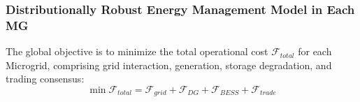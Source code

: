 \documentclass[preprint,12pt]{elsarticle}
\begin{document}
\subsubsection{Distributionally Robust Energy Management Model in Each MG}
The global objective is to minimize the total operational cost $\mathcal{F}_{total}$ for each Microgrid, comprising grid interaction, generation, storage degradation, and trading consensus:
\begin{equation}
\min \mathcal{F}_{total} = \mathcal{F}_{grid} + \mathcal{F}_{DG} + \mathcal{F}_{BESS} + \mathcal{F}_{trade}
\label{eq:total_cost}
\end{equation}
\makeatletter
\newenvironment{breakablealgorithm}
  {%
   \begin{center}
     \refstepcounter{algorithm}%
     \hrule height.8pt depth0pt \kern2pt%
     \renewcommand{\caption}[2][\relax]{%
       {\raggedright\textbf{~Algorithm~\thealgorithm:} ##2\par}%
       \ifx\relax##1\relax\addcontentsline{loa}{algorithm}{\protect\numberline{\thealgorithm}##2}\else\addcontentsline{loa}{algorithm}{\protect\numberline{\thealgorithm}##1}\fi
       \kern2pt\hrule\kern2pt
     }
  }{%
     \kern2pt\hrule\relax%
   \end{center}
  }
\makeatother
\end{document}
